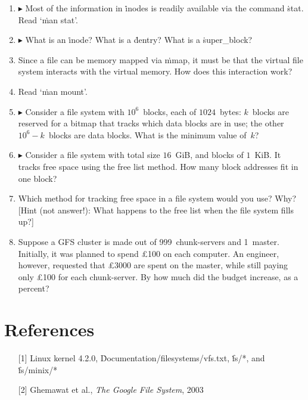 \begin{enumerate}
\item
  $\blacktriangleright$
  Most of the information in \.{inode}s is readily available via the command \.{stat}.
  Read `\.{man stat}'.
\item
  $\blacktriangleright$
  What is an \.{inode}?
  What is a \.{dentry}?
  What is a \.{super\_block}?
\item
  Since a file can be memory mapped via \.{mmap},
    it must be that the virtual file system interacts with the virtual memory.
  How does this interaction work?
\item
  Read `\.{man mount}'.
\item
  $\blacktriangleright$
  Consider a file system with $10^6$~blocks, each of $1024$~bytes:
  $k$~blocks are reserved for a bitmap that tracks which data blocks are in use;
  the other $10^6-k$~blocks are data blocks.
  What is the minimum value of~$k$?
\item
  $\blacktriangleright$
  Consider a file system with total size $16$~GiB, and blocks of $1$~KiB.
  It tracks free space using the free list method.
  How many block addresses fit in one block?
\item
  Which method for tracking free space in a file system would you use?
  Why?
  [Hint (not answer!): What happens to the free list when the file system fills up?]
\item
  Suppose a GFS cluster is made out of 999~chunk-servers and 1~master.
  Initially, it was planned to spend \pounds100 on each computer.
  An engineer, however, requested that \pounds3000 are spent on the master,
    while still paying only \pounds100 for each chunk-server.
  By how much did the budget increase, as a percent?
\end{enumerate}

\section*{References}

\begin{itemize}
\item[{[1]}]
  Linux kernel 4.2.0,
  \.{Documentation/filesystems/vfs.txt},
  \.{fs/*},
  and \.{fs/minix/*}
\item[{[2]}]
  Ghemawat et al., \emph{The Google File System}, 2003
\end{itemize}




